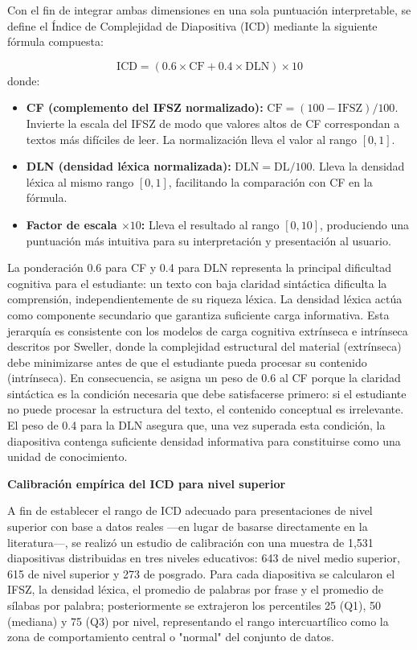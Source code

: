 \documentclass[11pt]{article}
\begin{document}
Con el fin de integrar ambas dimensiones en una sola puntuación interpretable, se define el Índice de Complejidad de Diapositiva (ICD) mediante la siguiente fórmula compuesta:

\[
\mathrm{ICD} = (0.6 \times \mathrm{CF} + 0.4 \times \mathrm{DLN}) \times 10
\]
donde:
\begin{itemize}
    \item \textbf{CF (complemento del IFSZ normalizado):} $\mathrm{CF} = (100 - \mathrm{IFSZ}) / 100$. Invierte la escala del IFSZ de modo que valores altos de CF correspondan a textos más difíciles de leer. La normalización lleva el valor al rango $[0,1]$.
    \item \textbf{DLN (densidad léxica normalizada):} $\mathrm{DLN} = \mathrm{DL} / 100$. Lleva la densidad léxica al mismo rango $[0,1]$, facilitando la comparación con CF en la fórmula.
    \item \textbf{Factor de escala $\times 10$:} Lleva el resultado al rango $[0,10]$, produciendo una puntuación más intuitiva para su interpretación y presentación al usuario.
\end{itemize}
La ponderación 0.6 para CF y 0.4 para DLN representa la principal dificultad cognitiva para el estudiante: un texto con baja claridad sintáctica dificulta la comprensión, independientemente de su riqueza léxica. La densidad léxica actúa como componente secundario que garantiza suficiente carga informativa. Esta jerarquía es consistente con los modelos de carga cognitiva extrínseca e intrínseca descritos por Sweller, donde la complejidad estructural del material (extrínseca) debe minimizarse antes de que el estudiante pueda procesar su contenido (intrínseca). 
En consecuencia, se asigna un peso de 0.6 al CF porque la claridad sintáctica es la condición necesaria que debe satisfacerse primero: si el estudiante no puede procesar la estructura del texto, el contenido conceptual es irrelevante. El peso de 0.4 para la DLN asegura que, una vez superada esta condición, la diapositiva contenga suficiente densidad informativa para constituirse como una unidad de conocimiento.

\textbf{Calibración empírica del ICD para nivel superior}

A fin de establecer el rango de ICD adecuado para presentaciones de nivel superior con base a datos reales —en lugar de basarse directamente en la literatura—, se realizó un estudio de calibración con una muestra de 1,531 diapositivas distribuidas en tres niveles educativos: 643 de nivel medio superior, 615 de nivel superior y 273 de posgrado. Para cada diapositiva se calcularon el IFSZ, la densidad léxica, el promedio de palabras por frase y el promedio de sílabas por palabra; posteriormente se extrajeron los percentiles 25 (Q1), 50 (mediana) y 75 (Q3) por nivel, representando el rango intercuartílico como la zona de comportamiento central o "normal" del conjunto de datos.
\end{document}
